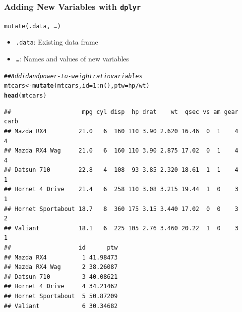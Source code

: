 \documentclass{beamer}\usepackage[]{graphicx}\usepackage[]{color}
\makeatletter
\newcommand{\hlnum}[1]{\textcolor[rgb]{0.686,0.059,0.569}{#1}}%
\newcommand{\hlcom}[1]{\textcolor[rgb]{0.678,0.584,0.686}{\textit{#1}}}%
\newcommand{\hlopt}[1]{\textcolor[rgb]{0,0,0}{#1}}%
\newcommand{\hlstd}[1]{\textcolor[rgb]{0.345,0.345,0.345}{#1}}%
\newcommand{\hlkwb}[1]{\textcolor[rgb]{0.69,0.353,0.396}{#1}}%
\newcommand{\hlkwc}[1]{\textcolor[rgb]{0.333,0.667,0.333}{#1}}%
\newcommand{\hlkwd}[1]{\textcolor[rgb]{0.737,0.353,0.396}{\textbf{#1}}}%
\newenvironment{kframe}{%
 \def\at@end@of@kframe{}%
 \ifinner\ifhmode%
  \def\at@end@of@kframe{\end{minipage}}%
  \begin{minipage}{\columnwidth}%
 \fi\fi%
 \def\FrameCommand##1{\hskip\@totalleftmargin \hskip-\fboxsep
 \colorbox{shadecolor}{##1}\hskip-\fboxsep
     \hskip-\linewidth \hskip-\@totalleftmargin \hskip\columnwidth}%
 \MakeFramed {\advance\hsize-\width
   \@totalleftmargin\z@ \linewidth\hsize
   \@setminipage}}%
 {\par\unskip\endMakeFramed%
 \at@end@of@kframe}
\newenvironment{knitrout}{}{} %
\makeatother
\begin{document}
\begin{frame}[fragile]\frametitle{Adding New Variables with \texttt{dplyr}}
    \texttt{mutate(.data, \ldots)}
    \begin{itemize}
        \item \texttt{.data}: Existing data frame
        \item \texttt{\ldots}: Names and values of new variables
    \end{itemize}
\begin{knitrout}\footnotesize
{}\color{fgcolor}\begin{kframe}
\begin{alltt}
\hlcom{## Add id and power-to-weight ratio variables}
\hlstd{mtcars} \hlkwb{<-} \hlkwd{mutate}\hlstd{(mtcars,} \hlkwc{id} \hlstd{=} \hlnum{1}\hlopt{:}\hlkwd{n}\hlstd{(),} \hlkwc{ptw} \hlstd{= hp} \hlopt{/} \hlstd{wt)}
\hlkwd{head}\hlstd{(mtcars)}
\end{alltt}
\begin{verbatim}
##                    mpg cyl disp  hp drat    wt  qsec vs am gear carb
## Mazda RX4         21.0   6  160 110 3.90 2.620 16.46  0  1    4    4
## Mazda RX4 Wag     21.0   6  160 110 3.90 2.875 17.02  0  1    4    4
## Datsun 710        22.8   4  108  93 3.85 2.320 18.61  1  1    4    1
## Hornet 4 Drive    21.4   6  258 110 3.08 3.215 19.44  1  0    3    1
## Hornet Sportabout 18.7   8  360 175 3.15 3.440 17.02  0  0    3    2
## Valiant           18.1   6  225 105 2.76 3.460 20.22  1  0    3    1
##                   id      ptw
## Mazda RX4          1 41.98473
## Mazda RX4 Wag      2 38.26087
## Datsun 710         3 40.08621
## Hornet 4 Drive     4 34.21462
## Hornet Sportabout  5 50.87209
## Valiant            6 30.34682
\end{verbatim}
\end{kframe}
\end{knitrout}
\end{frame}
\end{document}
